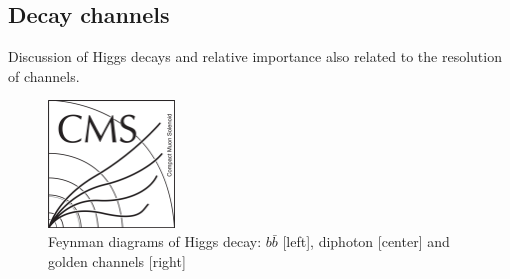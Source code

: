 

\subsection{Decay channels}

Discussion of Higgs decays and relative importance also related to the resolution of channels.

\begin{figure}[!Hhtbp]
  \begin{center}
    \includegraphics[width=0.3\textwidth]{figs/CMSlogo.png}
    \caption{Feynman diagrams of Higgs decay: $b\bar{b}$ [left], diphoton [center] and golden channels [right]}
    \label{fig:HiggsDecays}
  \end{center}
\end{figure}


